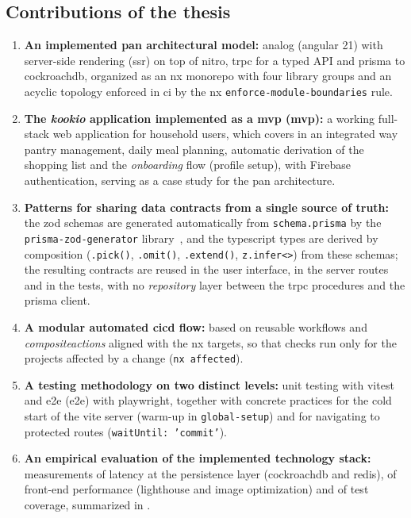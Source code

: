 \subsection{Contributions of the thesis}\label{sec:contributii}
\begin{enumerate}
  \item \textbf{An implemented \gls{pan} architectural model:} \gls{analog} (\gls{angular} 21) with server-side rendering (\acrshort{ssr}) on top of \gls{nitro}, \acrshort{trpc} for a typed API and \gls{prisma} to \gls{cockroachdb}, organized as an \gls{nx} \gls{monorepo} with four library groups and an acyclic topology enforced in \acrshort{ci} by the \gls{nx} \texttt{enforce-module-boundaries} rule.
  \item \textbf{The \textit{\gls{kookio}} application implemented as a \acrlong{mvp} (\acrshort{mvp}):} a working full-stack \gls{web} application for household users, which covers in an integrated way pantry management, daily meal planning, automatic derivation of the shopping list and the \textit{onboarding} flow (profile setup), with Firebase authentication, serving as a case study for the \gls{pan} architecture.
  \item \textbf{Patterns for sharing data contracts from a single source of truth:} the \gls{zod} schemas are generated automatically from \texttt{schema.prisma} by the \texttt{prisma-zod-generator} library~\cite{prisma_zod_generator}, and the \gls{typescript} types are derived by composition (\texttt{.pick()}, \texttt{.omit()}, \texttt{.extend()}, \texttt{z.infer<>}) from these schemas; the resulting contracts are reused in the user interface, in the server routes and in the tests, with no \textit{repository} layer between the \acrshort{trpc} procedures and the \gls{prisma} client.
  \item \textbf{A modular automated \gls{cicd} flow:} based on reusable \glspl{workflow} and \textit{\glspl{compositeaction}} aligned with the \gls{nx} targets, so that checks run only for the projects affected by a change (\texttt{nx affected}).
  \item \textbf{A testing methodology on two distinct levels:} unit testing with \gls{vitest} and \acrlong{e2e} (\acrshort{e2e}) with \gls{playwright}, together with concrete practices for the cold start of the \gls{vite} server (warm-up in \texttt{global-setup}) and for navigating to protected routes (\texttt{waitUntil: 'commit'}).
  \item \textbf{An empirical evaluation of the implemented technology stack:} measurements of latency at the persistence layer (\gls{cockroachdb} and \gls{redis}), of front-end performance (\gls{lighthouse} and image optimization) and of test coverage, summarized in .
\end{enumerate}

